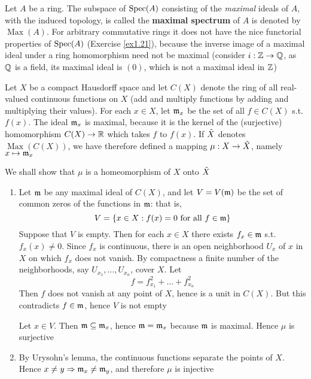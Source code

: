 \documentclass[11pt]{article}
\DeclareMathOperator{\Max}{Max}
\begin{document}
\begin{exercise}
\label{ex1.26}
Let \(A\) be a ring.  The subspace of \(\operatorname{Spec}(A)\) consisting of the \emph{maximal} ideals of \(A\),
with the induced topology, is called the \textbf{maximal spectrum} of \(A\) is denoted by \(\Max(A)\).
For arbitrary commutative rings it does not have the nice functorial properties of \(\operatorname{Spec}(A)\)
(Exercise \ref{ex1.21}), because the inverse image of a maximal ideal under a ring homomorphism
need not be maximal (consider \(i:\mathbb{Z}\to\mathbb{Q}\), as \(\mathbb{Q}\) is a field, its maximal ideal is \((0)\),
which is not a maximal ideal in \(\mathbb{Z}\))

Let \(X\) be a compact Hausdorff space and let \(C(X)\) denote the ring of all real-valued
continuous functions on \(X\) (add and multiply functions by adding and multiplying their
values). For each \(x\in X\), let \(\mathfrak{m}_x\) be the set of all \(f\in C(X)\) s.t. \(f(x)\). The
ideal \(\mathfrak{m}_x\) is maximal, because it is the kernel of the (surjective) homomorphism \(C(X)\to\mathbb{R}\)
which takes \(f\) to \(f(x)\). If \(\tilde{X}\) denotes \(\Max(C(X))\), we have therefore defined a
mapping \(\mu:X\to\tilde{X}\), namely \(x\mapsto\mathfrak{m}_x\)

We shall show that \(\mu\) is a homeomorphism of \(X\) onto \(\tilde{X}\)

\begin{enumerate}
\item Let \(\mathfrak{m}\) be any maximal ideal of \(C(X)\), and let \(V=V(\mathfrak{m})\) be the set of common zeros of
the functions in \(\mathfrak{m}\): that is,
\begin{equation*}
V=\{x\in X:f(x)=0\text{ for all }f\in\mathfrak{m}\}
\end{equation*}
Suppose that \(V\) is empty. Then for each \(x\in X\) there exists \(f_x\in\mathfrak{m}\) s.t. \(f_x(x)\neq 0\).
Since \(f_x\) is continuous, there is an open neighborhood \(U_x\) of \(x\) in \(X\) on
which \(f_x\) does not vanish. By compactness a finite number of the neighborhoods,
say \(U_{x_1},\dots,U_{x_n}\), cover \(X\). Let
\begin{equation*}
f=f_{x_1}^2+\dots+f_{x_n}^2
\end{equation*}
Then \(f\) does not vanish at any point of \(X\), hence is a unit in \(C(X)\). But this
contradicts \(f\in\mathfrak{m}\), hence \(V\) is not empty

Let \(x\in V\). Then \(\mathfrak{m}\subseteq\mathfrak{m}_x\), hence \(\mathfrak{m}=\mathfrak{m}_x\) because \(\mathfrak{m}\) is maximal. Hence \(\mu\) is surjective

\item By Urysohn's lemma, the continuous functions separate the points of \(X\).
Hence \(x\neq y\Rightarrow \mathfrak{m}_x\neq\mathfrak{m}_y\), and therefore \(\mu\) is injective


\end{enumerate}
\end{exercise}
\end{document}
